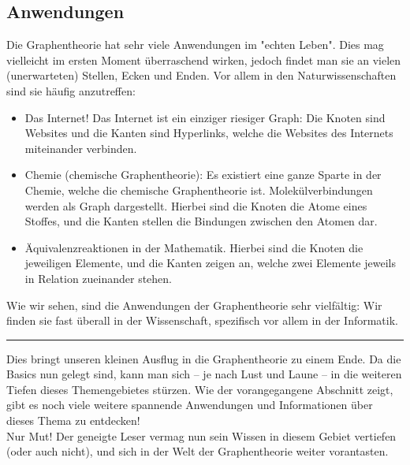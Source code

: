 \documentclass{article}
\theoremstyle{plain}
\begin{document}
\subsection{Anwendungen}
Die Graphentheorie hat sehr viele Anwendungen im "echten Leben". Dies mag vielleicht im ersten Moment überraschend wirken, jedoch findet man sie an vielen (unerwarteten) Stellen, Ecken und Enden. Vor allem in den Naturwissenschaften sind sie häufig anzutreffen:\\
\begin{itemize}
	\item{Das Internet! Das Internet ist ein einziger riesiger Graph: Die Knoten sind Websites und die Kanten sind Hyperlinks, welche die Websites des Internets miteinander verbinden.}
	\item{Chemie (chemische Graphentheorie): Es existiert eine ganze Sparte in der Chemie, welche die chemische Graphentheorie ist. Molekülverbindungen werden als Graph dargestellt. Hierbei sind die Knoten die Atome eines Stoffes, und die Kanten stellen die Bindungen zwischen den Atomen dar.}
	\item{Äquivalenzreaktionen in der Mathematik. Hierbei sind die Knoten die jeweiligen Elemente, und die Kanten zeigen an, welche zwei Elemente jeweils in Relation zueinander stehen.}
\end{itemize}
Wie wir sehen, sind die Anwendungen der Graphentheorie sehr vielfältig: Wir finden sie fast überall in der Wissenschaft, spezifisch vor allem in der Informatik.\\
\hrule
\bigskip
Dies bringt unseren kleinen Ausflug in die Graphentheorie zu einem Ende. Da die Basics nun gelegt sind, kann man sich -- je nach Lust und Laune -- in die weiteren Tiefen dieses Themengebietes stürzen. Wie der vorangegangene Abschnitt zeigt, gibt es noch viele weitere spannende Anwendungen und Informationen über dieses Thema zu entdecken!\\
Nur Mut! Der geneigte Leser vermag nun sein Wissen in diesem Gebiet vertiefen (oder auch nicht), und sich in der Welt der Graphentheorie weiter vorantasten.
\newpage
\end{document}
